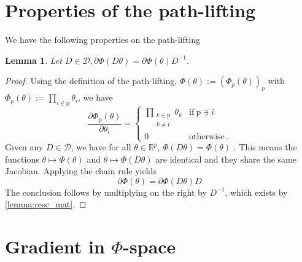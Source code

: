 \documentclass{article}
\theoremstyle{plain}
\newtheorem{lemma}[theorem]{Lemma}
\theoremstyle{definition}
\theoremstyle{remark}
\def\Dcal{\mathcal{D}}
\def\path{{\mathrm{p}}}
\def\Dcal{{\mathcal{D}}}
\begin{document}
{


\newpage
\appendix
\onecolumn



\section{Properties of the path-lifting \label{sec:path_lifting_prop}}

We have the following properties on the path-lifting
\begin{lemma}
    \label{lemma:path_properties}
Let $D \in \Dcal, \partial \Phi(D \theta) = \partial \Phi(\theta) D^{-1}$.
\end{lemma}
\begin{proof}
Using the definition of the path-lifting, $\Phi(\theta) := (\Phi_{p}(\theta))_{p}$ with $\Phi_{p}(\theta) := \prod_{i \in \path} \theta_i$, we have
\begin{equation}
\frac{\partial \Phi_{\path}(\theta)}{\partial \theta_{i}} = \begin{cases}
\prod_{\substack{k \in \path \\ k \neq i}} \theta_{k} & \text{if}\ \path \ni i\\
0 & \text{otherwise}\,.
\end{cases}
\end{equation}
Given any $D \in \Dcal$, we have for all $\theta \in \mathbb{R}^p$, $\Phi(D \theta) = \Phi(\theta)$ \citep[Theorem 2.4.1]{gonon2024harnessing}.
This means the functions $\theta \mapsto \Phi(\theta)$ and $\theta \mapsto \Phi(D\theta)$ are identical and they share the same Jacobian. Applying the chain rule yields
\begin{equation}
    \partial \Phi(\theta) = \partial \Phi(D\theta)D
\end{equation}
The conclusion follows by multiplying on the right by $D^{-1}$, which exists by \cref{lemma:resc_mat}.
\end{proof}
 
\section{Gradient in $\Phi$-space \label{sec:GDPhiSpace}}

}
\end{document}
